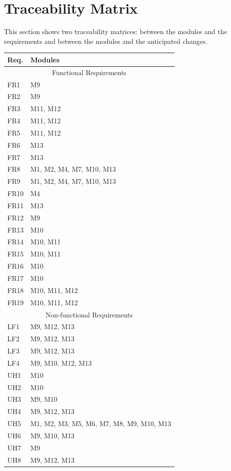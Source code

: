 \documentclass[12pt, titlepage]{article}
\begin{document}
\section{Traceability Matrix} \label{SecTM}

This section shows two traceability matrices: between the modules and the
requirements and between the modules and the anticipated changes.

\begin{table}[H]
\centering
\begin{tabular}{p{} p{}}
\toprule
\textbf{Req.} & \textbf{Modules}\\
\midrule
\multicolumn{2}{c}{Functional Requirements} \\
\midrule
FR1 & M9\\
FR2 & M9\\
FR3 & M11, M12\\
FR4 & M11, M12\\
FR5 & M11, M12\\
FR6 & M13\\
FR7 & M13\\
FR8 &  M1, M2, M4, M7, M10, M13\\
FR9 &  M1, M2, M4, M7, M10, M13\\
FR10 & M4\\
FR11 & M13\\
FR12 & M9\\
FR13 & M10\\
FR14 & M10, M11\\
FR15 & M10, M11\\
FR16 & M10\\
FR17 & M10\\
FR18 & M10, M11, M12\\
FR19 & M10, M11, M12\\

\midrule
\multicolumn{2}{c}{Non-functional Requirements}\\
\midrule

LF1 & M9, M12, M13\\
LF2 & M9, M12, M13\\
LF3 & M9, M12, M13\\
LF4 & M9, M10, M12, M13\\
UH1 & M10\\
UH2 & M10\\
UH3 & M9, M10\\
UH4 & M9, M12, M13\\
UH5 &  M1, M2, M3, M5, M6, M7, M8, M9, M10, M13 \\
UH6 & M9, M10, M13\\
UH7 & M9\\
UH8 & M9, M12, M13\\

\bottomrule
\end{tabular}
\end{table}
\end{document}
